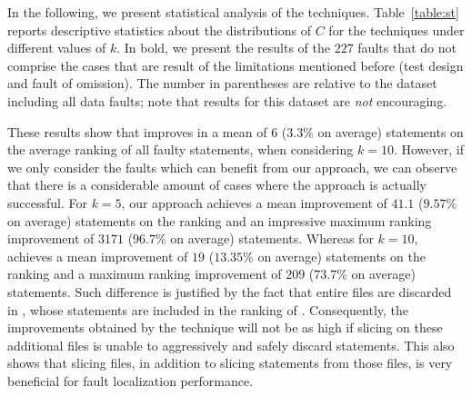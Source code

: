\documentclass{article}
\begin{document}

In the following, we present statistical analysis of the techniques.
Table~\ref{table:st} reports descriptive statistics about the
distributions of $C$ for the techniques under different values of $k$.
In bold, we present the results of the $227$ faults that do not
comprise the cases that are result of the limitations mentioned before
(test design and fault of omission). The number in parentheses are
relative to the dataset including all data faults; note that results
for this dataset are \emph{not} encouraging.

These results show that \ds{}
improves \sfl{} in a mean of $6$ ($3.3\%$ on average) statements on
the average ranking of all faulty statements, when considering
$k=10$.
However, if we only consider
the faults which can benefit from our approach, we can observe that
there is a considerable amount of cases where the approach is actually
successful. For $k=5$, our approach achieves a mean improvement of
$41.1$ ($9.57\%$ on average) statements on the ranking and an
impressive maximum ranking improvement of $3171$ ($96.7\%$ on average)
statements. Whereas for $k=10$,  achieves a mean
improvement of $19$ ($13.35\%$ on average) statements on the ranking
and a maximum ranking improvement of $209$ ($73.7\%$ on average)
statements. Such difference is justified by the fact that entire files
are discarded in , whose statements are included in the
ranking of . Consequently, the improvements obtained by
the technique will not be as high if slicing on these additional files
is unable to aggressively and safely discard statements. This also
shows that slicing files, in addition to slicing statements from those
files, is very beneficial for fault localization performance.
\end{document}

